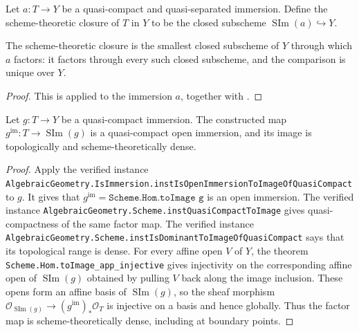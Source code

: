 \begin{definition}
  \label{def:nagata-scheme-theoretic-closure}

  Let $a\colon T\to Y$ be a quasi-compact and quasi-separated immersion.
  Define the scheme-theoretic closure of $T$ in $Y$ to be the closed
  subscheme $\operatorname{SIm}(a)\hookrightarrow Y$.
\end{definition}

\begin{lemma}
  \label{lemma:nagata-scheme-theoretic-closure-minimal}

  The scheme-theoretic closure is the smallest closed subscheme of $Y$
  through which $a$ factors: it factors through every such closed subscheme,
  and the comparison is unique over $Y$.
\end{lemma}

\begin{proof}
  This is  applied to the immersion
  $a$, together with
  .
\end{proof}

\begin{lemma}
  \label{lemma:nagata-immersion-open-in-scheme-image}

  Let $g\colon T\to Y$ be a quasi-compact immersion.  The constructed map
  $g^{\mathrm{im}}\colon T\to\operatorname{SIm}(g)$ is a quasi-compact open
  immersion, and its image is topologically and scheme-theoretically dense.
\end{lemma}

\begin{proof}
  Apply the verified instance
  \texttt{AlgebraicGeometry.IsImmersion.instIsOpenImmersionToImageOfQuasiCompact}
  to $g$.  It gives that
  $g^{\mathrm{im}}=\texttt{Scheme.Hom.toImage g}$ is an open immersion.
  The verified instance
  \texttt{AlgebraicGeometry.Scheme.instQuasiCompactToImage} gives
  quasi-compactness of the same factor map.
  The verified instance
  \texttt{AlgebraicGeometry.Scheme.instIsDominantToImageOfQuasiCompact} says
  that its topological range is
  dense.  For every affine open $V$ of $Y$, the theorem
  \texttt{Scheme.Hom.toImage\_app\_injective} gives injectivity on the
  corresponding affine open of $\operatorname{SIm}(g)$ obtained by pulling
  $V$ back along the image inclusion.  These opens form an affine basis of
  $\operatorname{SIm}(g)$, so the sheaf morphism
  $\mathcal O_{\operatorname{SIm}(g)}\to
  (g^{\mathrm{im}})_*\mathcal O_T$ is injective on a basis and hence globally.
  Thus the factor map is scheme-theoretically dense, including at boundary
  points.
\end{proof}

